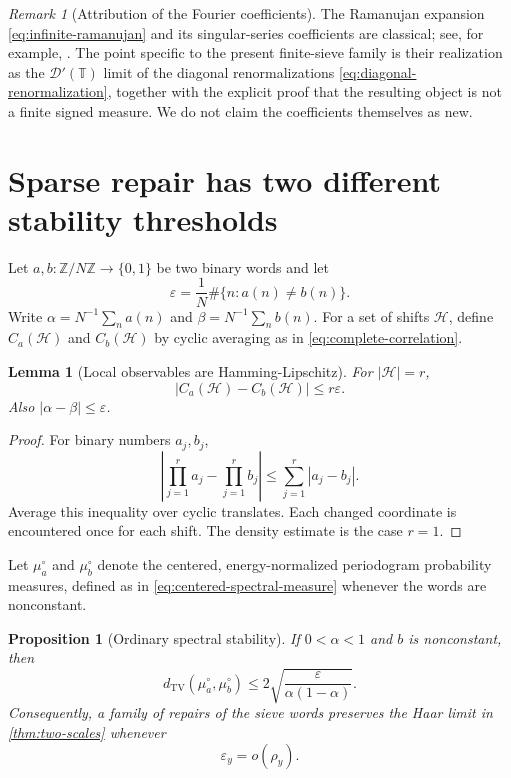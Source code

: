 \documentclass[11pt]{article}
\newtheorem{proposition}[theorem]{Proposition}
\newtheorem{lemma}[theorem]{Lemma}
\theoremstyle{definition}
\theoremstyle{remark}
\newtheorem{remark}[theorem]{Remark}
\newcommand{\Z}{\mathbb Z}
\newcommand{\T}{\mathbb T}
\newcommand{\cH}{\mathcal H}
\newcommand{\cD}{\mathcal D}
\newcommand{\eps}{\varepsilon}
\newcommand{\TV}{\mathrm{TV}}
\begin{document}
\begin{remark}[Attribution of the Fourier coefficients]\label{rem:ramanujan-attribution}
The Ramanujan expansion \eqref{eq:infinite-ramanujan} and its singular-series coefficients are classical; see, for example, \citet{GoldstonSuriajaya2021}.  The point specific to the present finite-sieve family is their realization as the $\cD'(\T)$ limit of the diagonal renormalizations \eqref{eq:diagonal-renormalization}, together with the explicit proof that the resulting object is not a finite signed measure.  We do not claim the coefficients themselves as new.
\end{remark}

\section{Sparse repair has two different stability thresholds}\label{sec:repair}

Let $a,b:\Z/N\Z\to\{0,1\}$ be two binary words and let
\begin{equation}\label{eq:hamming-density}
    \eps=\frac1N\#\{n:a(n)\ne b(n)\}.
\end{equation}
Write $\alpha=N^{-1}\sum_na(n)$ and $\beta=N^{-1}\sum_nb(n)$.  For a set of shifts $\cH$, define $C_a(\cH)$ and $C_b(\cH)$ by cyclic averaging as in \eqref{eq:complete-correlation}.

\begin{lemma}[Local observables are Hamming-Lipschitz]\label{lem:hamming-correlation}
For $|\cH|=r$,
\begin{equation}\label{eq:hamming-rpoint}
    |C_a(\cH)-C_b(\cH)|\le r\eps.
\end{equation}
Also $|\alpha-\beta|\le\eps$.
\end{lemma}

\begin{proof}
For binary numbers $a_j,b_j$,
\[
 \left|\prod_{j=1}^r a_j-\prod_{j=1}^r b_j\right|
 \le\sum_{j=1}^r|a_j-b_j|.
\]
Average this inequality over cyclic translates.  Each changed coordinate is encountered once for each shift.  The density estimate is the case $r=1$.
\end{proof}

Let $\mu_a^\circ$ and $\mu_b^\circ$ denote the centered, energy-normalized periodogram probability measures, defined as in \eqref{eq:centered-spectral-measure} whenever the words are nonconstant.

\begin{proposition}[Ordinary spectral stability]\label{prop:spectral-repair}
If $0<\alpha<1$ and $b$ is nonconstant, then
\begin{equation}\label{eq:spectral-repair-bound}
    d_{\TV}(\mu_a^\circ,\mu_b^\circ)
    \le2\sqrt{\frac{\eps}{\alpha(1-\alpha)}}.
\end{equation}
Consequently, a family of repairs of the sieve words preserves the Haar limit in \cref{thm:two-scales} whenever
\begin{equation}\label{eq:first-order-repair-scale}
    \eps_y=o(\rho_y).
\end{equation}
\end{proposition}
\end{document}
